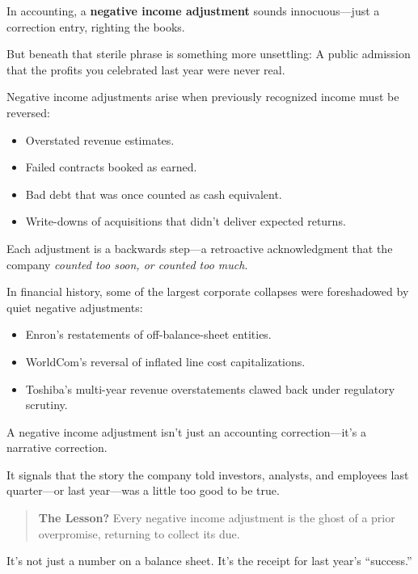 \begin{tcolorbox}[
  colback=blue!5!white,
  colframe=blue!50!black,
  breakable,
  title={Historical Sidebar: The Ghost of Profits Past --- Negative Income Adjustment}
]


In accounting, a \textbf{negative income adjustment} sounds innocuous—just a correction entry, righting the books.

But beneath that sterile phrase is something more unsettling:  
A public admission that the profits you celebrated last year were never real.

\medskip

Negative income adjustments arise when previously recognized income must be reversed:
\begin{itemize}
    \item Overstated revenue estimates.
    \item Failed contracts booked as earned.
    \item Bad debt that was once counted as cash equivalent.
    \item Write-downs of acquisitions that didn’t deliver expected returns.
\end{itemize}

Each adjustment is a backwards step—a retroactive acknowledgment that the company \textit{counted too soon, or counted too much}.

\medskip

In financial history, some of the largest corporate collapses were foreshadowed by quiet negative adjustments:
\begin{itemize}
    \item Enron’s restatements of off-balance-sheet entities.
    \item WorldCom’s reversal of inflated line cost capitalizations.
    \item Toshiba’s multi-year revenue overstatements clawed back under regulatory scrutiny.
\end{itemize}

\medskip

A negative income adjustment isn’t just an accounting correction—it’s a narrative correction.

It signals that the story the company told investors, analysts, and employees last quarter—or last year—was a little too good to be true.

\medskip

\begin{quote}
\textbf{The Lesson?} Every negative income adjustment is the ghost of a prior overpromise, returning to collect its due.
\end{quote}

It’s not just a number on a balance sheet.  
It’s the receipt for last year’s “success.”
\end{tcolorbox}



